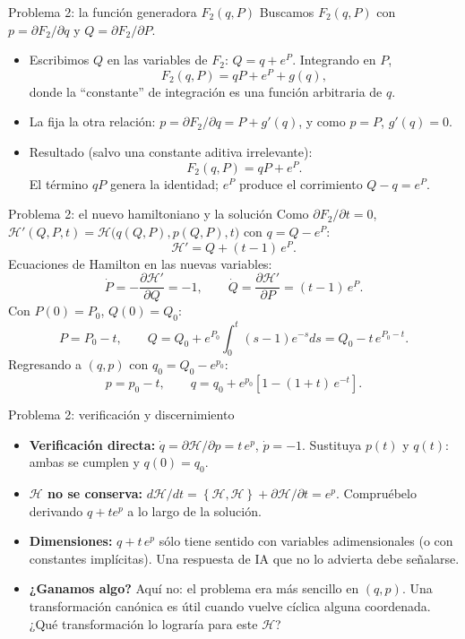 \documentclass[spanish]{beamer}
\newcommand{\Ham}{\mathcal{H}}
\newcommand{\pd}[2]{\frac{\partial #1}{\partial #2}}
\newcommand{\pb}[2]{\left\{#1,#2\right\}}   %
\begin{document}
\begin{frame}{Problema 2: la función generadora $F_2(q,P)$}
Buscamos $F_2(q,P)$ con $p = \partial F_2/\partial q$ y $Q = \partial F_2/\partial P$.
\begin{itemize}
  \item<2-> Escribimos $Q$ en las variables de $F_2$: $Q = q + e^{P}$. Integrando en $P$,
  \[
    F_2(q,P) = qP + e^{P} + g(q) ,
  \]
  donde la ``constante'' de integración es una \alert{función arbitraria de $q$}.
  \item<3-> La fija la otra relación:
  $p = \partial F_2/\partial q = P + g'(q)$, y como $p=P$, $g'(q)=0$.
  \item<4-> Resultado (salvo una constante aditiva irrelevante):
  \[
    F_2(q,P) = qP + e^{P} .
  \]
  El término $qP$ genera la identidad; $e^{P}$ produce el corrimiento
  $Q - q = e^{P}$.
\end{itemize}
\end{frame}

\begin{frame}{Problema 2: el nuevo hamiltoniano y la solución}
Como $\partial F_2/\partial t = 0$, $\Ham'(Q,P,t) = \Ham\big(q(Q,P),p(Q,P),t\big)$ con
$q = Q - e^{P}$:
\[
  \Ham' = Q + (t-1)\,e^{P} .
\]
\pause
Ecuaciones de Hamilton en las nuevas variables:
\[
  \dot P = -\pd{\Ham'}{Q} = -1 , \qquad
  \dot Q = \pd{\Ham'}{P} = (t-1)\,e^{P} .
\]
\pause
Con $P(0)=P_0$, $Q(0)=Q_0$:
\[
  P = P_0 - t, \qquad
  Q = Q_0 + e^{P_0}\!\int_0^t (s-1)e^{-s}ds = Q_0 - t\,e^{P_0 - t}.
\]
\pause
Regresando a $(q,p)$ con $q_0 = Q_0 - e^{p_0}$:
\[
  p = p_0 - t, \qquad q = q_0 + e^{p_0}\left[1 - (1+t)\,e^{-t}\right].
\]
\end{frame}

\begin{frame}{Problema 2: verificación y discernimiento}
\begin{itemize}
  \item<1-> \textbf{Verificación directa:} $\dot q = \partial\Ham/\partial p = t\,e^{p}$,
        $\dot p = -1$. Sustituya $p(t)$ y $q(t)$: ambas se cumplen y $q(0)=q_0$.
  \item<2-> \textbf{$\Ham$ no se conserva:}
        $d\Ham/dt = \pb{\Ham}{\Ham} + \partial\Ham/\partial t = e^{p}$.
        Compruébelo derivando $q+te^{p}$ a lo largo de la solución.
  \item<3-> \textbf{Dimensiones:} $q + t\,e^{p}$ sólo tiene sentido con variables
        adimensionales (o con constantes implícitas). Una respuesta de IA que no
        lo advierta debe señalarse.
  \item<4-> \textbf{¿Ganamos algo?} Aquí no: el problema era más sencillo en $(q,p)$.
        Una transformación canónica es útil cuando vuelve cíclica alguna
        coordenada. ¿Qué transformación lo lograría para este $\Ham$?
\end{itemize}
\end{frame}
\end{document}
